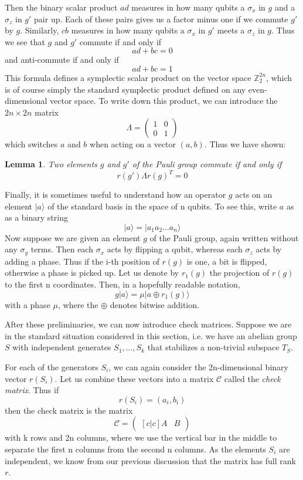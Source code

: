 \documentclass[a4paper, draft]{article}
\theoremstyle{own}
\newtheorem{lem}[thm]{Lemma}
\theoremstyle{remark}
\newcommand{\Z}{\mathbb{Z}}
\begin{document}
Then the binary scalar product $ad$ measures in how many qubits a $\sigma_x$ in $g$ and a $\sigma_z$ in $g'$ pair up. Each of these pairs gives us a factor minus one if we commute $g'$ by $g$. Similarly, $cb$ measures in how many qubits a $\sigma_x$ in $g'$ meets a $\sigma_z$ in $g$. Thus we see that $g$ and $g'$ commute if and only if
$$
ad + bc = 0
$$
and anti-commute if and only if
$$
ad + bc = 1
$$
This formula defines a symplectic scalar product on the vector space $\Z_2^{2n}$, which is of course simply the standard symplectic product defined on any even-dimensional vector space. To write down this product, we can introduce the $2n \times 2n$ matrix
$$
\Lambda = \begin{pmatrix} 
1 & 0 \\
0 & 1
\end{pmatrix}
$$
which switches $a$ and $b$ when acting on a vector $(a,b)$. Thus we have shown:

\begin{lem}
Two elements $g$ and $g'$ of the Pauli group commute if and only if
$$
r(g') \Lambda r(g)^T = 0
$$
\end{lem}

Finally, it is sometimes useful to understand how an operator $g$ acts on an element $|a \rangle$ of the standard basis in the space of n qubits. To see this, write $a$ as as a binary string
$$
|a \rangle = |a_1 a_2 \dots a_n \rangle
$$
Now suppose we are given an element $g$ of the Pauli group, again written without any $\sigma_y$ terms. Then each $\sigma_x$ acts by flipping a qubit, whereas each $\sigma_z$ acts by adding a phase. Thus if the i-th position of $r(g)$ is one, a bit is flipped, otherwise a phase is picked up. Let us denote by $r_1(g)$ the projection of $r(g)$ to the first n coordinates. Then, in a hopefully readable notation,
$$
g |a \rangle = \mu  | a \oplus r_1(g) \rangle
$$
with a phase $\mu$, where the $\oplus$ denotes bitwise addition. 


After these preliminaries, we can now introduce check matrices. Suppose we are in the standard situation considered in this section, i.e. we have an abelian group $S$ with independent generates $S_1, \dots, S_k$ that stabilizes a non-trivial subspace $T_S$. 

For each of the generators $S_i$, we can again consider the 2n-dimensional binary vector $r(S_i)$. Let us combine these vectors into a matrix $\mathcal{C}$ called the \emph{check matrix}. Thus if
$$
r(S_i)  = (a_i, b_i)
$$
then the check matrix is the matrix 
$$
\mathcal{C} = 
\begin{pmatrix}[c|c]
A & B
\end{pmatrix}
$$
with k rows and 2n columns, where we use the vertical bar in the middle to separate the first n columns from the second n columns. As the elements $S_i$ are independent, we know from our previous discussion that the matrix has full rank $r$.
\end{document}
